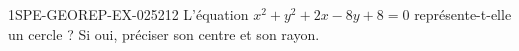 \begin{exercice}{1SPE-GEOREP-EX-025}{2}{12}
L'équation $x^2 + y^2 + 2x - 8y + 8 = 0$ représente-t-elle un cercle ? Si oui, préciser son centre et son rayon.
\end{exercice}
